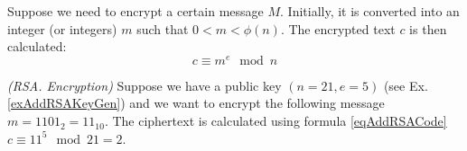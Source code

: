 Suppose we need to encrypt a certain message $M$. Initially, it is
converted into an integer (or integers) $m$ such that 
$0 < m < \phi\left(n\right)$. The encrypted text $c$ is then calculated:
\begin{equation}
c \equiv m^e \mod{n}
\label{eqAddRSACode}
\end{equation}

\begin{example}
\emph{(RSA. Encryption)}
Suppose we have a public key $\left(n=21, e=5\right)$ (see Ex. \ref{exAddRSAKeyGen}) 
and we want to encrypt the following message $m = 1101_2 = 11_{10}$. 
The ciphertext is calculated using formula \eqref{eqAddRSACode} $c \equiv 11^5 \mod{21} = 2$.
\label{exAddRSACode}
\end{example}